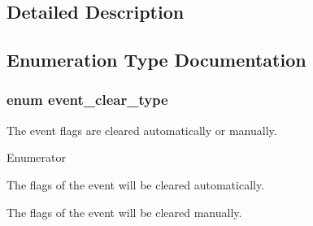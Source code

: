 \subsection{Detailed Description}


\subsection{Enumeration Type Documentation}
\subsubsection[{\texorpdfstring{event\+\_\+clear\+\_\+type}{event_clear_type}}]{\setlength{\rightskip}{0pt plus 5cm}enum {\bf event\+\_\+clear\+\_\+type}}\hypertarget{group__os__abstraction_ga083d5ac6d512ad2b2bd45651974118c3}{}\label{group__os__abstraction_ga083d5ac6d512ad2b2bd45651974118c3}


The event flags are cleared automatically or manually. 

\begin{Desc}
\item[Enumerator]\par
\begin{description}
\item[{\em 
k\+Event\+Auto\+Clr\hypertarget{group__os__abstraction_gga083d5ac6d512ad2b2bd45651974118c3accde3a58b1a1a4d8f43e9ad1ff65f15f}{}\label{group__os__abstraction_gga083d5ac6d512ad2b2bd45651974118c3accde3a58b1a1a4d8f43e9ad1ff65f15f}
}]The flags of the event will be cleared automatically. \item[{\em 
k\+Event\+Manual\+Clr\hypertarget{group__os__abstraction_gga083d5ac6d512ad2b2bd45651974118c3ae5ee2c4e06ff3860a756b9c954286077}{}\label{group__os__abstraction_gga083d5ac6d512ad2b2bd45651974118c3ae5ee2c4e06ff3860a756b9c954286077}
}]The flags of the event will be cleared manually. \end{description}
\end{Desc}
